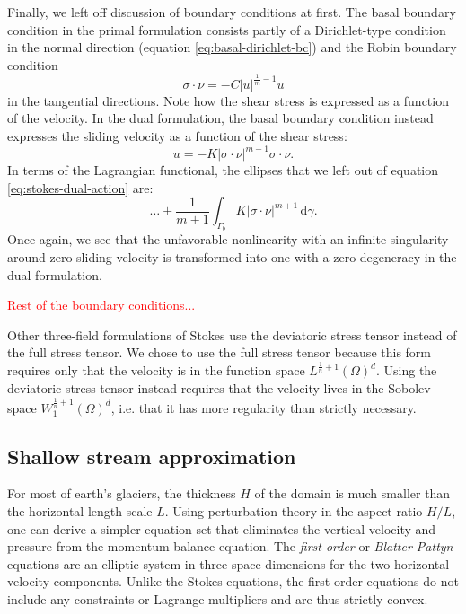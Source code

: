 \documentclass{article}
\theoremstyle{definition}
\theoremstyle{plain}
\newcommand{\ud}{\hspace{2pt}\mathrm{d}}
\begin{document}
Finally, we left off discussion of boundary conditions at first.
The basal boundary condition in the primal formulation consists partly of a Dirichlet-type condition in the normal direction (equation \eqref{eq:basal-dirichlet-bc}) and the Robin boundary condition
\begin{equation}
    \sigma\cdot\nu = -C|u|^{\frac{1}{m} - 1}u
\end{equation}
in the tangential directions.
Note how the shear stress is expressed as a function of the velocity.
In the dual formulation, the basal boundary condition instead expresses the sliding velocity as a function of the shear stress:
\begin{equation}
    u = -K|\sigma\cdot\nu|^{m - 1}\sigma\cdot\nu.
\end{equation}
In terms of the Lagrangian functional, the ellipses that we left out of equation \eqref{eq:stokes-dual-action} are:
\begin{equation}
    \ldots + \frac{1}{m + 1}\int_{\Gamma_b} K|\sigma\cdot\nu|^{m + 1}\ud\gamma.
\end{equation}
Once again, we see that the unfavorable nonlinearity with an infinite singularity around zero sliding velocity is transformed into one with a zero degeneracy in the dual formulation.

\textcolor{red}{Rest of the boundary conditions...}

Other three-field formulations of Stokes use the deviatoric stress tensor instead of the full stress tensor.
We chose to use the full stress tensor because this form requires only that the velocity is in the function space $L^{\frac{1}{n} + 1}(\Omega)^d$.
Using the deviatoric stress tensor instead requires that the velocity lives in the Sobolev space $W^{\frac{1}{n} + 1}_1(\Omega)^d$, i.e. that it has more regularity than strictly necessary.


\subsection{Shallow stream approximation}

For most of earth's glaciers, the thickness $H$ of the domain is much smaller than the horizontal length scale $L$.
Using perturbation theory in the aspect ratio $H / L$, one can derive a simpler equation set that eliminates the vertical velocity and pressure from the momentum balance equation.
The \emph{first-order} or \emph{Blatter-Pattyn} equations are an elliptic system in three space dimensions for the two horizontal velocity components.
Unlike the Stokes equations, the first-order equations do not include any constraints or Lagrange multipliers and are thus strictly convex.
\end{document}

